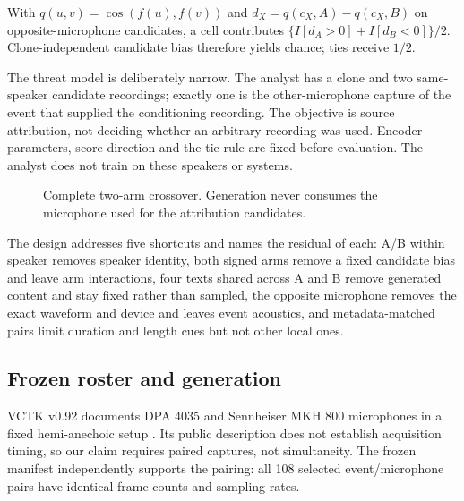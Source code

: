 \documentclass[10pt,twocolumn,letterpaper]{article}
\begin{document}
With $q(u,v)=\cos(f(u),f(v))$ and $d_X=q(c_X,A)-q(c_X,B)$ on
opposite-microphone candidates, a cell contributes
$\{I[d_A>0]+I[d_B<0]\}/2$. Clone-independent candidate bias therefore yields
chance; ties receive $1/2$.

The threat model is deliberately narrow. The analyst has a clone and two
same-speaker candidate recordings; exactly one is the other-microphone capture
of the event that supplied the conditioning recording.
The objective is source attribution, not deciding whether an arbitrary
recording was used. Encoder parameters, score direction and the tie rule are
fixed before evaluation. The analyst does not train on these speakers or
systems.

\begin{figure}[t]
\centering
{}
\caption{Complete two-arm crossover. Generation never consumes the microphone
used for the attribution candidates.}
\label{fig:design}
\end{figure}

The design addresses five shortcuts and names the residual of each: A/B within
speaker removes speaker identity, both signed arms remove a fixed candidate
bias and leave arm interactions, four texts shared across A and B remove
generated content and stay fixed rather than sampled, the opposite microphone
removes the exact waveform and device and leaves event acoustics, and
metadata-matched pairs limit duration and length cues but not other local ones.

\subsection{Frozen roster and generation}
VCTK v0.92 documents DPA 4035 and Sennheiser MKH 800 microphones in a fixed
hemi-anechoic setup \cite{vctk}. Its public description does not establish
acquisition timing, so our claim requires paired captures, not simultaneity.
The frozen manifest independently supports the pairing: all 108 selected
event/microphone pairs have identical frame counts and sampling rates.
\end{document}

